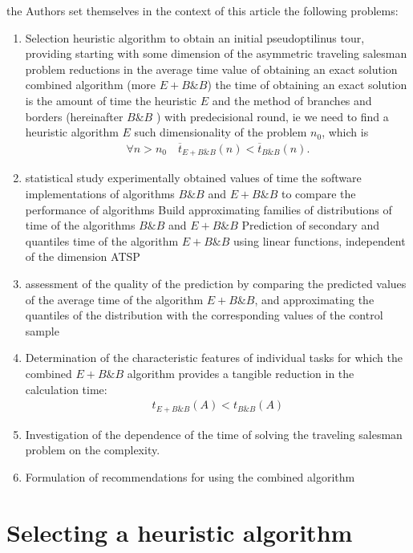 \documentclass[12pt]{article}
\begin{document}
 
 the Authors set themselves in the context of this article the following problems: 
 \begin{enumerate} 
 \item Selection heuristic algorithm to obtain an initial pseudoptilinus tour, providing starting with some dimension of the asymmetric traveling salesman problem reductions in the average time value of obtaining an exact solution
combined algorithm (more $E+B\&B$) the time of obtaining an exact solution is the amount of time the heuristic $E$ and the method of branches and borders (hereinafter $B\&B$ ) with predecisional round, ie
we need to find a heuristic algorithm $E$ such dimensionality of the problem $n_0$, which is 
	\begin{align} 
	\forall n>n_0\quad\overline{t}_{E+B\&B}(n)<\overline{t}_{B\&B}(n).\label{(1)} 
 	\end{align} 
 \item statistical study experimentally obtained values of time the software implementations of algorithms 
 $B\&B$ and $E+B\&B$ to compare the performance of algorithms
Build approximating families of distributions of time of the algorithms $B\&B$ and $E+B\&B$
Prediction of secondary and quantiles time of the algorithm $E+B\&B$ using linear functions, independent of the dimension ATSP

 \item assessment of the quality of the prediction by comparing the predicted values of the average time of the algorithm $E+B\&B$, and approximating the quantiles of the distribution with the corresponding values of the control sample

 
 \item Determination of the characteristic features of individual tasks for which the combined $E+B\&B$ algorithm provides a tangible reduction in the calculation time: 
 \begin{align} 
 {t_{E+B\&B}(A)}<{t_{B\&B}(A)}
\label{(2)} 
 \end{align} 
 	 
 
 \item Investigation of the dependence of the time of solving the traveling salesman problem on the complexity. 
 \item Formulation of recommendations for using the combined algorithm

 \end {enumerate} 
  
 \section {Selecting a heuristic algorithm} 
  
\end{document}
